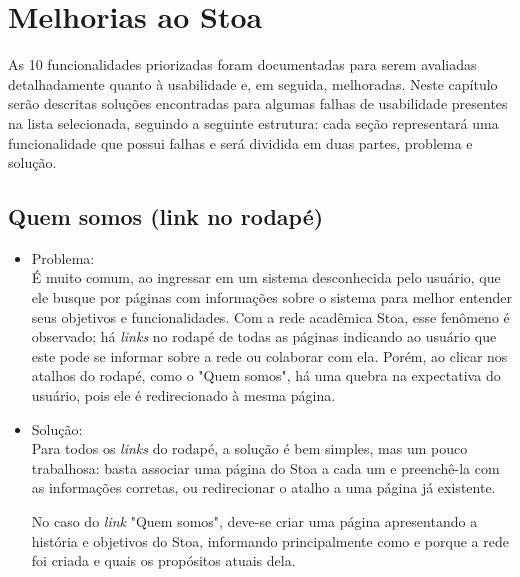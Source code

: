 \chapter{Melhorias ao Stoa}
\label{cap:melhorias}

    As 10 funcionalidades priorizadas foram documentadas para serem avaliadas detalhadamente quanto à usabilidade e, em seguida, melhoradas. Neste capítulo serão descritas soluções encontradas para algumas falhas de usabilidade presentes na lista selecionada, seguindo a seguinte estrutura: cada seção representará uma funcionalidade que possui falhas e será dividida em duas partes, problema e solução.


\section{Quem somos (link no rodapé)}
\label{sec:quem-somos}
    \begin{itemize}
    \item Problema:\\
    É muito comum, ao ingressar em um sistema desconhecida pelo usuário, que ele busque por páginas com informações sobre o sistema para melhor entender seus objetivos e funcionalidades. Com a rede acadêmica Stoa, esse fenômeno é observado; há \emph{links} no rodapé de todas as páginas indicando ao usuário que este pode se informar sobre a rede ou colaborar com ela. Porém, ao clicar nos atalhos do rodapé, como o "Quem somos", há uma quebra na expectativa do usuário, pois ele é redirecionado à mesma página.

    \item Solução:\\
    Para todos os \emph{links} do rodapé, a solução é bem simples, mas um pouco trabalhosa: basta associar uma página do Stoa a cada um e preenchê-la com as informações corretas, ou redirecionar o atalho a uma página já existente.
    
    No caso do \emph{link} "Quem somos", deve-se criar uma página apresentando a história e objetivos do Stoa, informando principalmente como e porque a rede foi criada e quais os propósitos atuais dela.
    \end{itemize}

